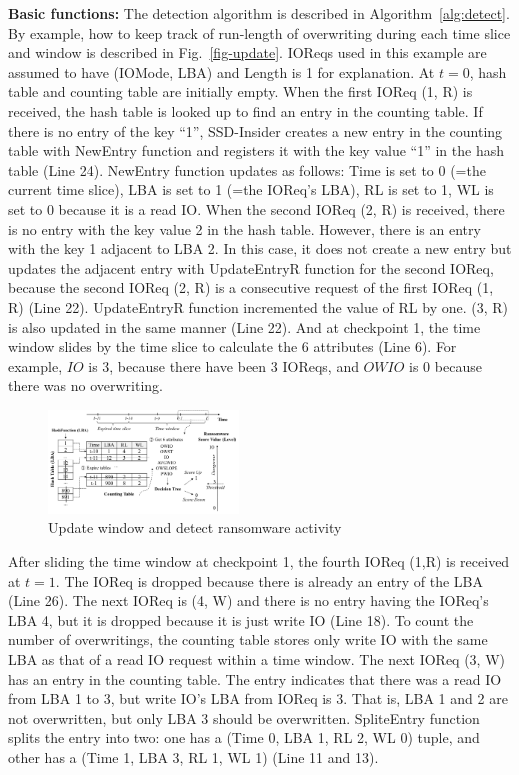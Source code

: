 \documentclass[conference]{IEEEtran}
\newcommand{\ours}{SSD-Insider}
\begin{document}
{\bf Basic functions:} 
The detection algorithm is described in Algorithm~\ref{alg:detect}.
By example, how to keep track of run-length of 
overwriting during each time slice and window is described in Fig.~\ref{fig-update}.  
IOReqs used in this example are assumed to have (IOMode, LBA) and Length is 1
for explanation. 
At $t=0$, hash table and counting table are initially empty.
When the first IOReq (1, R) is received, the hash table is looked up to find an entry 
in the counting table. If there is no entry of the key ``1'', \ours{} creates
a new entry in the counting table with NewEntry function and registers it with the 
key value ``1'' in the hash table (Line 24). NewEntry function updates as follows: Time is set to 0 
(=the current time slice), LBA is set to 1 (=the IOReq's LBA), RL is set to 1,
WL is set to 0 because it is a read IO. When the second IOReq (2, R) is received, 
there is no entry with the key value 2 in the hash table. However, there is 
an entry with the key 1 adjacent to LBA 2. In this case, it does not create 
a new entry but updates the adjacent entry with UpdateEntryR function for the second IOReq,
because the second IOReq (2, R) is a consecutive request of the first IOReq (1, R) (Line 22).
UpdateEntryR function incremented the value of RL by one. (3, R) is also updated 
in the same manner (Line 22). And at checkpoint 1, the time window slides by the time slice 
to calculate the 6 attributes (Line 6). 
For example, $IO$ is 3, because there have been 3 IOReqs, 
and $OWIO$ is 0 because there was no overwriting. 

\begin{figure}
	\includegraphics[width=0.45\textwidth]{fig/windowupdate.png}
	\caption{Update window and detect ransomware activity}\label{fig-sw}
\end{figure}
After sliding the time window at checkpoint 1, the fourth IOReq (1,R) is received at 
$t=1$. The IOReq is dropped because there is already an entry of the LBA (Line 26). 
The next IOReq is (4, W) and there is no entry having the IOReq's LBA 4, 
but it is dropped because it is just write IO (Line 18). 
To count the number of overwritings, the counting table stores only write IO with the same LBA 
as that of a read IO request within a time window. The next IOReq (3, W) has an entry 
in the counting table. The entry indicates that there was a read IO from LBA 1 to 3, 
but write IO's LBA from IOReq is 3. 
 That is, LBA 1 and 2 are not overwritten, but only LBA 3 should be overwritten.
SpliteEntry function splits the entry into two: one has a (Time 0, LBA 1, RL 2, WL 0) tuple,
and other has a (Time 1, LBA 3, RL 1, WL 1) (Line 11 and 13). 
\end{document}
